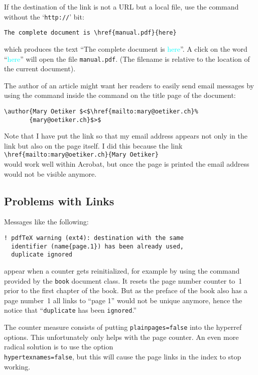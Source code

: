 If the destination of the link is not a URL but a local file,
use the  command without the \enquote*{\texttt{http://}} bit:
\begin{verbatim}
The complete document is \href{manual.pdf}{here}
\end{verbatim}
which produces the text ``The complete document is \textcolor{cyan}{here}''.
A click on the word
``\textcolor{cyan}{here}''
will open the file \texttt{manual.pdf}. (The filename is relative to
the location of the current document).

The author of an article might want her readers to easily send
email messages by using the  command inside the 
command on the title page of the document:
\begin{code}
\begin{verbatim}
\author{Mary Oetiker $<$\href{mailto:mary@oetiker.ch}%
       {mary@oetiker.ch}$>$
\end{verbatim}
\end{code}
Note that I have put the link so that my email address appears not only
in the link but also on the page itself. I did this because the
link\\
\verb+\href{mailto:mary@oetiker.ch}{Mary Oetiker}+\\
would
work well within Acrobat, but once the page is printed the email address
would not be visible anymore.

\subsection{Problems with Links}

Messages like the following:
\begin{verbatim}
! pdfTeX warning (ext4): destination with the same
  identifier (name{page.1}) has been already used,
  duplicate ignored
\end{verbatim}
appear when a counter gets reinitialized, for example by using
the command  provided by the \texttt{book} document class. It
resets the page number counter to~1 prior to the first chapter of the
book. But as the preface of the book also has a page number~1 all
links to ``page 1'' would not be unique anymore, hence the notice
that ``\verb+duplicate+ has been \verb+ignored+.''

The counter measure consists of putting \texttt{plainpages=false} into
the hyperref options. This unfortunately only helps with the page
counter.
An even more radical solution is to use the option\\
\texttt{hypertexnames=false}, but this will cause the page links in
the index to stop working.

